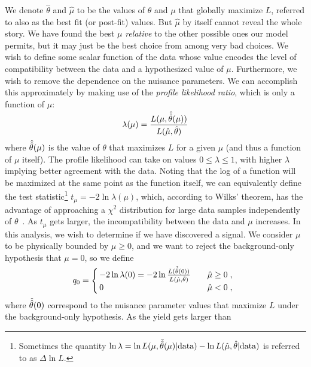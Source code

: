 We denote $\hat{\theta}$ and $\hat{\mu}$ to be the values of $\theta$ and $\mu$
that globally maximize $L$, referred to also as the best fit (or post-fit)
values. But $\hat{\mu}$ by itself cannot reveal the whole story. We have found the
best $\mu$ \emph{relative} to the other possible ones our model permits, but
it may just be the best choice from among very bad choices. We
wish to define some scalar function of the data whose value encodes the level of
compatibility between the data and a hypothesized value of $\mu$. Furthermore,
we wish to remove the dependence on the nuisance parameters. We can accomplish
this approximately by making use of the \emph{profile likelihood ratio}, which
is only a function of $\mu$:
\begin{equation}
\label{eq:likelihoodratio}
\lambda(\mu) = \frac{L(\mu, \smash{\hat{\hat{\theta}}}(\mu))}{L(\hat{\mu}, \hat{\theta})}
\end{equation}
where $\smash{\hat{\hat{\theta}}}(\mu)$ is the value of $\theta$ that maximizes $L$ for
a given $\mu$ (and thus a function of $\mu$ itself). The profile likelihood can
take on values $0 \leq \lambda \leq 1$, with higher $\lambda$ implying better
agreement with the data. Noting that the log of a function will be maximized at
the same point as the function itself, we can equivalently define the test
statistic\footnote{Sometimes the quantity $\ln\lambda=\ln L(\mu,\smash{\hat{\hat{\theta}}}(\mu)|\text{data})-\ln L(\hat{\mu}, \hat{\theta}|\text{data})$
is referred to as $\Delta \ln L$.} $t_\mu=-2\ln \lambda(\mu)$, which,
according to Wilks' theorem, has the advantage of approaching a $\chi^2$ distribution
for large data samples independently of $\theta$~\cite{Cowan2011}. As $t_\mu$
gets larger, the incompatibility between the data and $\mu$ increases. In this
analysis, we wish to determine if we have discovered a signal. We consider $\mu$
to be physically bounded by $\mu \geq 0$, and we want to reject the
background-only hypothesis that $\mu=0$, so we define
\begin{equation}
  \label{eq:q0}
  q_{0} =
  \left\{ \! \! \begin{array}{ll}
      - 2 \ln \lambda(0) = -2 \ln \frac{L(\smash{\hat{\hat{\theta}}}(0))}{L(\hat{\mu}, \hat{\theta})}
      & \quad \hat{\mu} \ge 0 \;, \\
      0 & \quad \hat{\mu} < 0  \;,
    \end{array}
  \right.
\end{equation}
where $\smash{\hat{\hat{\theta}}}(0)$ correspond to the nuisance parameter values that
maximize $L$ under the background-only hypothesis. As the yield gets larger than
